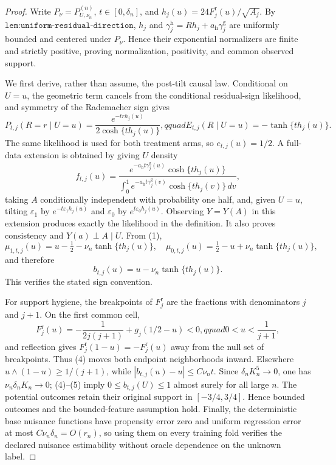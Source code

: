 \documentclass{article}
\begin{document}
\begin{proof}
Write \(P_\nu=P_{U,\nu_n}^{(n)}\), \(t\in[0,\delta_n]\), and \(h_j(u)=24F_j^{\mathrm r}(u)/\sqrt{A_j}\).  By \(\texttt{lem:uniform-residual-direction}\), \(h_j\) and \(\gamma_j^{\mathrm h}=Rh_j+a_{\mathrm h}\gamma_j^{\mathrm g}\) are uniformly bounded and centered under \(P_\nu\).  Hence their exponential normalizers are finite and strictly positive, proving normalization, positivity, and common observed support.

We first derive, rather than assume, the post-tilt causal law.  Conditional on \(U=u\), the geometric term cancels from the conditional residual-sign likelihood, and symmetry of the Rademacher sign gives
\[
 P_{t,j}(R=r\mid U=u)=\frac{e^{-trh_j(u)}}{2\cosh\{th_j(u)\}},qquad
 E_{t,j}(R\mid U=u)=-\tanh\{th_j(u)\}.                                  \tag{1}
\]
The same likelihood is used for both treatment arms, so \(e_{t,j}(u)=1/2\).  A full-data extension is obtained by giving \(U\) density
\[
 f_{t,j}(u)=\frac{e^{-a_{\mathrm h}t\gamma_j^{\mathrm g}(u)}
 \cosh\{th_j(u)\}}
 {\int_0^1e^{-a_{\mathrm h}t\gamma_j^{\mathrm g}(v)}\cosh\{th_j(v)\}\,dv},             \tag{2}
\]
taking \(A\) conditionally independent with probability one half, and, given \(U=u\), tilting \(\varepsilon_1\) by \(e^{-t\varepsilon_1h_j(u)}\) and \(\varepsilon_0\) by \(e^{t\varepsilon_0h_j(u)}\).  Observing \(Y=Y(A)\) in this extension produces exactly the likelihood in the definition.  It also proves consistency and \(Y(a)\perp A\mid U\).  From (1),
\[
 \mu_{1,t,j}(u)=u-\tfrac12-\nu_n\tanh\{th_j(u)\},\quad
 \mu_{0,t,j}(u)=\tfrac12-u+\nu_n\tanh\{th_j(u)\},                         \tag{3}
\]
and therefore
\[
 b_{t,j}(u)=u-\nu_n\tanh\{th_j(u)\}.                                    \tag{4}
\]
This verifies the stated sign convention.

For support hygiene, the breakpoints of \(F_j^{\mathrm r}\) are the fractions with denominators \(j\) and \(j+1\).  On the first common cell,
\[
 F_j^{\mathrm r}(u)=-\frac1{2j(j+1)}+g_j(1/2-u)<0,qquad
 0<u<\frac1{j+1},                                                         \tag{5}
\]
and reflection gives \(F_j^{\mathrm r}(1-u)=-F_j^{\mathrm r}(u)\) away from the null set of breakpoints.  Thus (4) moves both endpoint neighborhoods inward.  Elsewhere \(u\wedge(1-u)\geq1/(j+1)\), while \(|b_{t,j}(u)-u|\leq C\nu_nt\).  Since \(\delta_nK_n^5\to0\), one has \(\nu_n\delta_nK_n\to0\); (4)--(5) imply \(0\leq b_{t,j}(U)\leq1\) almost surely for all large \(n\).  The potential outcomes retain their original support in \([-3/4,3/4]\).  Hence bounded outcomes and the bounded-feature assumption hold.  Finally, the deterministic base nuisance functions have propensity error zero and uniform regression error at most \(C\nu_n\delta_n=O(r_n)\), so using them on every training fold verifies the declared nuisance estimability without oracle dependence on the unknown label.


\end{proof}
\end{document}
